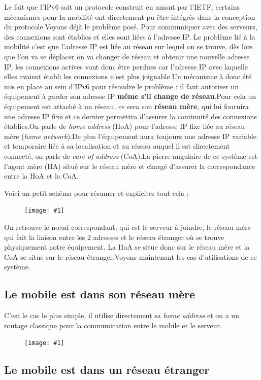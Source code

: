 \documentclass[a4paper,11pt,final]{article}
\newcommand{\scalefig}[3]{
  \begin{figure}[ht!]
    \centering
    \texttt{[image: \#1]}
    \caption{#3}
    \label{#1}
  \end{figure}}
\begin{document}
Le fait que l’IPv6 soit un protocole construit en amont par l’IETF, certains mécanismes pour la mobilité ont directement pu être intégrés dans la conception du protocole.Voyons déjà le problème posé. Pour communiquer avec des serveurs, des connexions sont établies et elles sont liées à l’adresse IP. Le problème lié à la mobilité c’est que l’adresse IP est liée au réseau sur lequel on se trouve, dès lors que l’on va se déplacer on va changer de réseau et obtenir une nouvelle adresse IP, les connexions actives vont donc être perdues car l’adresse IP avec laquelle elles avaient établi les connexions n’est plus joignable.Un mécanisme à donc été mis en place au sein d’IPv6 pour résoudre le problème : il faut autoriser un équipement à garder son adresse IP \textbf{même s’il change de réseau}.Pour cela un équipement est attaché à un réseau, ce sera son \textbf{réseau mère}, qui lui fournira une adresse IP fixe et ce dernier permettra d’assurer la continuité des connexions établies.On parle de \emph{home address} (HoA) pour l’adresse IP fixe liée au réseau mère (\emph{home network}).De plus l’équipement aura toujours une adresse IP variable et temporaire liée à sa localisation et au réseau auquel il est directement connecté, on parle de \emph{care-of address} (CoA).La pierre angulaire de ce système est l’agent mère (HA) situé sur le réseau mère et chargé d’assurer la correspondance entre la HoA et la CoA.

Voici un petit schéma pour résumer et expliciter tout cela :

\scalefig{images/schema1}{.7}{}

On retrouve le nœud correspondant, qui est le serveur à joindre, le réseau mère qui fait la liaison entre les 2 adresses et le réseau étranger où se trouve physiquement notre équipement. La HoA se situe donc sur le réseau mère et la CoA se situe sur le réseau étranger.Voyons maintenant les cas d’utilisations de ce système.

\subsection{Le mobile est dans son réseau mère}

C’est le cas le plus simple, il utilise directement sa \emph{home address} et on a un routage classique pour la communication entre le mobile et le serveur.

\scalefig{images/schema2}{.7}{}

\subsection{Le mobile est dans un réseau étranger}
\end{document}
